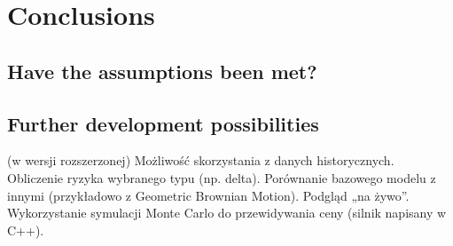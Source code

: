 \chapter{Conclusions}
\section{Have the assumptions been met?}
\section{Further development possibilities}
    (w wersji rozszerzonej)
    Możliwość skorzystania z danych historycznych.
    Obliczenie ryzyka wybranego typu (np. delta).
    Porównanie bazowego modelu z innymi (przykładowo z Geometric Brownian Motion).
    Podgląd „na żywo”.
    Wykorzystanie symulacji Monte Carlo do przewidywania ceny (silnik napisany w C++).
